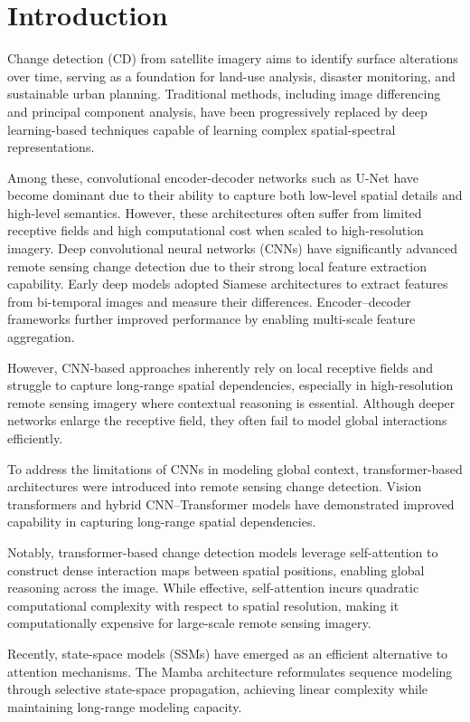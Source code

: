\documentclass[10pt,conference]{IEEEtran}
\begin{document}
\section{Introduction}
Change detection (CD) from satellite imagery aims to identify surface alterations over time, serving as a foundation for land-use analysis, disaster monitoring, and sustainable urban planning. Traditional methods, including image differencing and principal component analysis, have been progressively replaced by deep learning-based techniques capable of learning complex spatial-spectral representations.

Among these, convolutional encoder-decoder networks such as U-Net \cite{ronneberger2015u} have become dominant due to their ability to capture both low-level spatial details and high-level semantics. However, these architectures often suffer from limited receptive fields and high computational cost when scaled to high-resolution imagery.
Deep convolutional neural networks (CNNs) have significantly advanced remote sensing change detection due to their strong local feature extraction capability. Early deep models adopted Siamese architectures to extract features from bi-temporal images and measure their differences. Encoder–decoder frameworks further improved performance by enabling multi-scale feature aggregation.

However, CNN-based approaches inherently rely on local receptive fields and struggle to capture long-range spatial dependencies, especially in high-resolution remote sensing imagery where contextual reasoning is essential. Although deeper networks enlarge the receptive field, they often fail to model global interactions efficiently.

To address the limitations of CNNs in modeling global context, transformer-based architectures were introduced into remote sensing change detection. Vision transformers and hybrid CNN–Transformer models have demonstrated improved capability in capturing long-range spatial dependencies.

Notably, transformer-based change detection models leverage self-attention to construct dense interaction maps between spatial positions, enabling global reasoning across the image. While effective, self-attention incurs quadratic computational complexity with respect to spatial resolution, making it computationally expensive for large-scale remote sensing imagery.


Recently, state-space models (SSMs) have emerged as an efficient alternative to attention mechanisms. The Mamba architecture \cite{gu2023mamba} reformulates sequence modeling through selective state-space propagation, achieving linear complexity while maintaining long-range modeling capacity.
\end{document}
